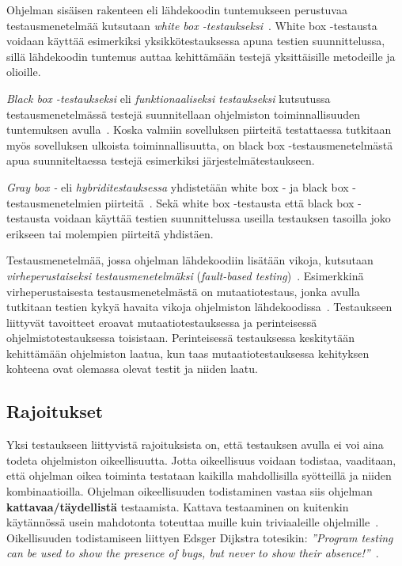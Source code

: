 \documentclass[finnish, grading]{tktltiki2}
\theoremstyle{definition}
\theoremstyle{remark}
\begin{document}
Ohjelman sisäisen rakenteen eli lähdekoodin tuntemukseen perustuvaa testausmenetelmää kutsutaan \textit{white box -testaukseksi}~\cite[s. 52]{Binder:1999}. White box -testausta voidaan käyttää esimerkiksi yksikkötestauksessa apuna testien suunnittelussa, sillä lähdekoodin tuntemus auttaa kehittämään testejä yksittäisille metodeille ja olioille.

\textit{Black box -testaukseksi} eli \textit{funktionaaliseksi testaukseksi} kutsutussa testausmenetelmässä testejä suunnitellaan ohjelmiston toiminnallisuuden tuntemuksen avulla~\cite[s. 52]{Binder:1999}. Koska valmiin sovelluksen piirteitä testattaessa tutkitaan myös sovelluksen ulkoista toiminnallisuutta, on black box -testausmenetelmästä apua suunniteltaessa testejä esimerkiksi järjestelmätestaukseen.

\textit{Gray box -} eli \textit{hybriditestauksessa} yhdistetään white box - ja black box -testausmenetelmien piirteitä~\cite[s. 52]{Binder:1999}. Sekä white box -testausta että black box -testausta voidaan käyttää testien suunnittelussa useilla testauksen tasoilla joko erikseen tai molempien piirteitä yhdistäen.

Testausmenetelmää, jossa ohjelman lähdekoodiin lisätään vikoja, kutsutaan \textit{virheperustaiseksi testausmenetelmäksi} (\textit{fault-based testing})~\cite[s. 52]{Binder:1999}. Esimerkkinä virheperustaisesta testausmenetelmästä on mutaatiotestaus, jonka avulla tutkitaan testien kykyä havaita vikoja ohjelmiston lähdekoodissa~\cite[s. 36]{DeMillo:Lipton:Sayward:1978}. Testaukseen liittyvät tavoitteet eroavat mutaatiotestauksessa ja perinteisessä ohjelmistotestauksessa toisistaan. Perinteisessä testauksessa keskitytään kehittämään ohjelmiston laatua, kun taas mutaatiotestauksessa kehityksen kohteena ovat olemassa olevat testit ja niiden laatu.

\subsection{Rajoitukset}

Yksi testaukseen liittyvistä rajoituksista on, että testauksen avulla ei voi aina todeta ohjelmiston oikeellisuutta. Jotta oikeellisuus voidaan todistaa, vaaditaan, että ohjelman oikea toiminta testataan kaikilla mahdollisilla syötteillä ja niiden kombinaatioilla. Ohjelman oikeellisuuden todistaminen vastaa siis ohjelman \textbf{kattavaa/täydellistä} testaamista. Kattava testaaminen on kuitenkin käytännössä usein mahdotonta toteuttaa muille kuin triviaaleille ohjelmille~\cite[s. 58]{Binder:1999}. Oikellisuuden todistamiseen liittyen Edsger Dijkstra totesikin: \textit{''Program testing can be used to show the presence of bugs, but never to show their absence!''}~\cite[s. 6]{Dahl:Dijkstra:Hoare:1972}.
\end{document}

